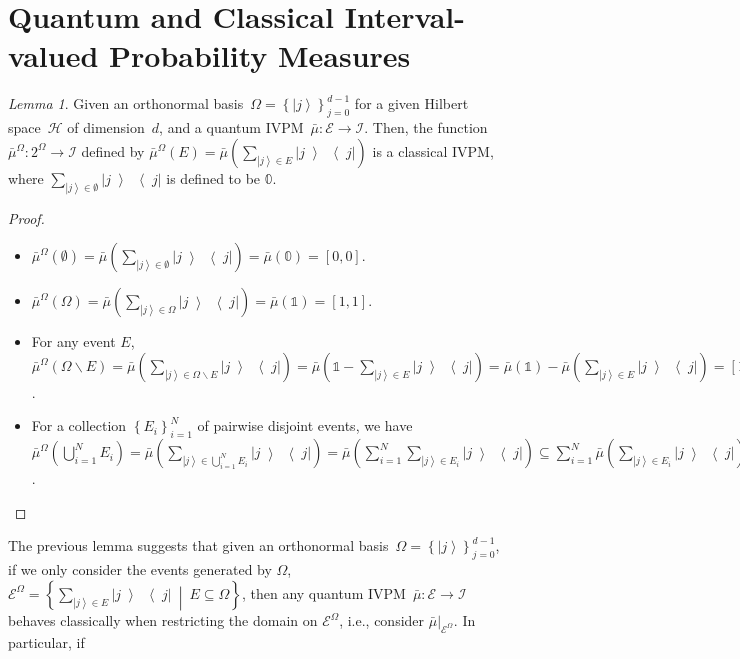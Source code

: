 \documentclass{article}
\theoremstyle{remark}
\newtheorem{lemma}{Lemma}
\newcommand{\Hilb}{\mathcal{H}}
\newcommand{\events}{\ensuremath{\mathcal{E}}}
\newcommand{\ket}[1]{{\left\vert{#1}\right\rangle}}
\newcommand{\op}[2]{\ensuremath{\left\vert{#1}\middle\rangle\middle\langle{#2}\right\vert}}
\newcommand{\proj}[1]{\op{#1}{#1}}
\newcommand{\set}[2]{\ensuremath{\left\{ {#1}~\middle|~{#2}\right\} }}
\begin{document}
\section{Quantum and Classical Interval-valued Probability Measures}

\begin{lemma}Given an orthonormal basis~$\Omega=\left\{ \ket{j}\right\} _{j=0}^{d-1}$
for a given Hilbert space~$\Hilb$ of dimension~$d$, and a quantum
IVPM~$\bar{\mu}:\events\rightarrow\mathscr{I}$. Then, the function
$\bar{\mu}^{\Omega}:2^{\Omega}\rightarrow\mathscr{I}$ defined by
$\bar{\mu}^{\Omega}\left(E\right)=\bar{\mu}\left(\sum_{\ket{j}\in E}\proj{j}\right)$
is a classical IVPM, where $\sum_{\ket{j}\in\emptyset}\proj{j}$ is
defined to be $\mathbb{0}$.\end{lemma}
\begin{proof}
~
\begin{itemize}
\item $\bar{\mu}^{\Omega}(\emptyset)=\bar{\mu}\left(\sum_{\ket{j}\in\emptyset}\proj{j}\right)=\bar{\mu}\left(\mathbb{0}\right)=[0,0]$. 
\item $\bar{\mu}^{\Omega}(\Omega)=\bar{\mu}\left(\sum_{\ket{j}\in\Omega}\proj{j}\right)=\bar{\mu}\left(\mathbb{1}\right)=[1,1]$. 
\item For any event $E$, $\bar{\mu}^{\Omega}\left(\Omega\backslash E\right)=\bar{\mu}\left(\sum_{\ket{j}\in\Omega\backslash E}\proj{j}\right)=\bar{\mu}\left(\mathbb{1}-\sum_{\ket{j}\in E}\proj{j}\right)=\bar{\mu}\left(\mathbb{1}\right)-\bar{\mu}\left(\sum_{\ket{j}\in E}\proj{j}\right)=\left[1,1\right]-\bar{\mu}^{\Omega}\left(E\right)$. 
\item For a collection $\left\{ E_{i}\right\} _{i=1}^{N}$ of pairwise disjoint
events, we have $\bar{\mu}^{\Omega}\left(\bigcup_{i=1}^{N}E_{i}\right)=\bar{\mu}\left(\sum_{\ket{j}\in\bigcup_{i=1}^{N}E_{i}}\proj{j}\right)=\bar{\mu}\left(\sum_{i=1}^{N}\sum_{\ket{j}\in E_{i}}\proj{j}\right)\subseteq\sum_{i=1}^{N}\bar{\mu}\left(\sum_{\ket{j}\in E_{i}}\proj{j}\right)=\sum_{i=1}^{N}\bar{\mu}\left(E_{i}\right)$. 
\end{itemize}
\end{proof}
The previous lemma suggests that given an orthonormal basis~$\Omega=\left\{ \ket{j}\right\} _{j=0}^{d-1}$,
if we only consider the events generated by $\Omega$, $\events^{\Omega}=\set{\sum_{\ket{j}\in E}\proj{j}}{E\subseteq\Omega}$,
then any quantum IVPM~$\bar{\mu}:\events\rightarrow\mathscr{I}$
behaves classically when restricting the domain on $\events^{\Omega}$,
i.e., consider $\bar{\mu}|_{\events^{\Omega}}$. In particular, if
\end{document}
